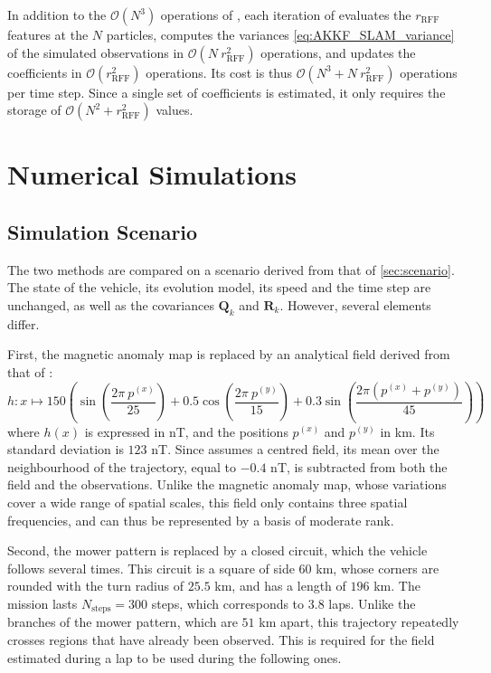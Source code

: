 \begin{remark}
	In addition to the $\mathcal{O}\left(N^3\right)$ operations of , each iteration of  evaluates the $r_{\mathrm{RFF}}$ features at the $N$ particles, computes the variances \eqref{eq:AKKF_SLAM_variance} of the simulated observations in $\mathcal{O}\left(N\:r_{\mathrm{RFF}}^2\right)$ operations, and updates the coefficients in $\mathcal{O}\left(r_{\mathrm{RFF}}^2\right)$ operations. Its cost is thus $\mathcal{O}\left(N^3+N\:r_{\mathrm{RFF}}^2\right)$ operations per time step. Since a single set of coefficients is estimated, it only requires the storage of $\mathcal{O}\left(N^2+r_{\mathrm{RFF}}^2\right)$ values.
\end{remark}

\section{Numerical Simulations}\label{sec:SLAM_results}

\subsection{Simulation Scenario}

The two methods are compared on a scenario derived from that of \cref{sec:scenario}. The state of the vehicle, its evolution model, its speed and the time step are unchanged, as well as the covariances $\mathbf{Q}_k$ and $\mathbf{R}_k$. However, several elements differ.

First, the magnetic anomaly map is replaced by an analytical field derived from that of \cite{bib:RFF-KKF-SLAM}:
\begin{equation}
	h:x\mapsto150\left(\sin\left(\frac{2\pi\:p^{(x)}}{25}\right)+0.5\cos\left(\frac{2\pi\:p^{(y)}}{15}\right)+0.3\sin\left(\frac{2\pi\left(p^{(x)}+p^{(y)}\right)}{45}\right)\right)
\end{equation}
where $h(x)$ is expressed in nT, and the positions $p^{(x)}$ and $p^{(y)}$ in km. Its standard deviation is $123$ nT. Since  assumes a centred field, its mean over the neighbourhood of the trajectory, equal to $-0.4$ nT, is subtracted from both the field and the observations. Unlike the magnetic anomaly map, whose variations cover a wide range of spatial scales, this field only contains three spatial frequencies, and can thus be represented by a basis of moderate rank.

Second, the mower pattern is replaced by a closed circuit, which the vehicle follows several times. This circuit is a square of side $60$ km, whose corners are rounded with the turn radius of $25.5$ km, and has a length of $196$ km. The mission lasts $N_\mathrm{steps}=300$ steps, which corresponds to $3.8$ laps. Unlike the branches of the mower pattern, which are $51$ km apart, this trajectory repeatedly crosses regions that have already been observed. This is required for the field estimated during a lap to be used during the following ones.

